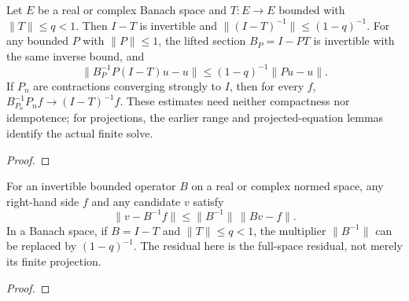 \begin{supporting}
\begin{theorem}
\label{thm:small-norm-finite-sections}
\leanok
Let $E$ be a real or complex Banach space and $T:E\to E$ bounded with
$\|T\|\le q<1$. Then $I-T$ is invertible and
$\|(I-T)^{-1}\|\le(1-q)^{-1}$.
For any bounded $P$ with $\|P\|\le1$, the lifted section $B_P=I-PT$ is
invertible with the same inverse bound, and
\[
 \|B_P^{-1}P(I-T)u-u\|\le(1-q)^{-1}\|Pu-u\|.
\]
If $P_n$ are contractions converging strongly to $I$, then for every $f$,
$B_{P_n}^{-1}P_nf\to(I-T)^{-1}f$.
These estimates need neither compactness nor idempotence; for projections,
the earlier range and projected-equation lemmas identify the actual finite solve.
\end{theorem}
\begin{proof}
\leanok
\end{proof}

\begin{theorem}
\label{thm:inverse-residual-error}
\leanok
For an invertible bounded operator $B$ on a real or complex normed space,
any right-hand side $f$ and any candidate $v$ satisfy
\[
 \|v-B^{-1}f\|\le\|B^{-1}\|\,\|Bv-f\|.
\]
In a Banach space, if $B=I-T$ and $\|T\|\le q<1$, the multiplier
$\|B^{-1}\|$ can be replaced by $(1-q)^{-1}$.
The residual here is the full-space residual, not merely its finite projection.
\end{theorem}
\begin{proof}
\leanok
\end{proof}
\end{supporting}


